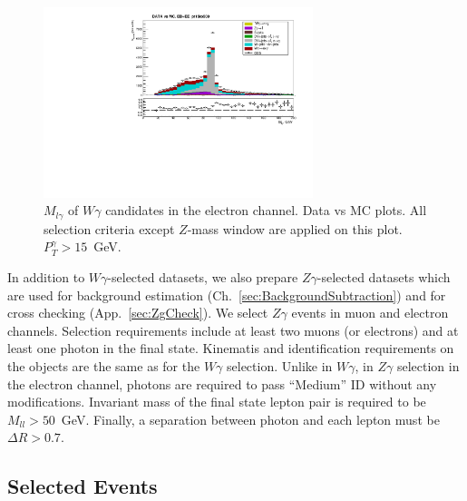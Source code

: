\begin{figure}[htb]
  \begin{center}
   \includegraphics[width=0.7\textwidth]{../figs/figs_v11/ELECTRON_WGamma/PrepareYields/c_TotalDATAvsMC_EtaCommon__Mpholep1PRELIMINARY_FOR_E_TO_GAMMA_WITH_PSV_CUT_pt15to500_.pdf}
  \caption{$M_{l\gamma}$ of $W\gamma$ candidates in the electron channel. Data vs MC plots. All selection criteria except $Z$-mass window are applied on this plot. $P_T^{\gamma}>15$~GeV. }
  \label{fig:DATAvsMC_Mpholep1}
  \end{center}
\end{figure}

In addition to $W\gamma$-selected datasets, we also prepare $Z\gamma$-selected datasets which are used for background estimation (Ch.~\ref{sec:BackgroundSubtraction}) and for cross checking (App.~\ref{sec:ZgCheck}). We select $Z\gamma$ events in muon and electron channels. Selection requirements include at least two muons (or electrons) and at least one photon in the final state. Kinematis and identification requirements on the objects are the same as for the $W\gamma$ selection. Unlike in $W\gamma$, in $Z\gamma$ selection in the electron channel, photons are required to pass ``Medium'' ID without any modifications. Invariant mass of the final state lepton pair is required to be $M_{ll}>50$~GeV. Finally, a separation between photon and each lepton must be $\Delta R>0.7$. 

\subsection{Selected Events}


